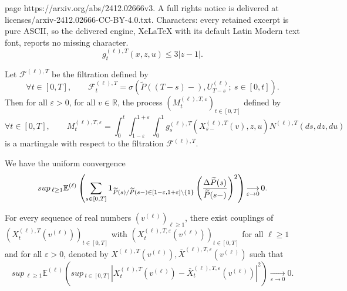 \documentclass[10pt,a4paper]{amsart}
\def\E{\mathbb{E}}
\def \R{\mathbb {R}}
\renewcommand{\sup}{sup\,}
\def\vp{\varepsilon}
\begin{document}
page https://arxiv.org/abs/2412.02666v3. A full rights notice is delivered at licenses/arxiv-2412.02666-CC-BY-4.0.txt. Characters: every retained excerpt is pure ASCII, so the delivered engine, XeLaTeX with its default Latin Modern text font, reports no missing character.
\begin{equation}\label{eq majoration g discret}
	g_t^{(\ell),T}(x,z,u) \le 3 \vert z-1 \vert.
\end{equation}

\begin{lemma}\label{lemme martingale}
	Let $\mathcal{F}^{(\ell),T}$ be the filtration defined by
	$$
	\forall t \in [0,T], \qquad
	\mathcal{F}^{(\ell),T}_t
	= \sigma\left(
	\widetilde{P}((T-s)-), U_{T-s}^{(\ell)}; \ s \in [0,t]
	\right).
	$$
	Then for all $\vp>0$, for all $v\in \R$, the process $(M^{(\ell),T,\vp}_t)_{t \in [0,T]}$ defined by
	$$
	\forall t \in [0,T],\qquad
	M^{(\ell),T,\vp}_t
	=\int_0^t\int_{1-\vp}^{1+\vp} \int_0^1 g_s^{(\ell),T} ( X^{(\ell),T}_{s-}(v),z,u) N^{(\ell),T}(ds,dz,du)
	$$
	is a martingale with respect to the filtration $\mathcal{F}^{(\ell),T}$.
\end{lemma}

\begin{lemma}\label{lemme petits sauts de P}
	We have the uniform convergence
	$$
	\sup_{\ell \ge 1}
	\E^{(\ell)}
	\left(
	\sum_{s \in[0,T]} {\bf 1}_{\widetilde{P}(s)/\widetilde{P}(s-) \in [1-\vp,1+\vp]\setminus \{1\}}
	\left(\frac{\Delta \widetilde{P}(s)}{\widetilde{P}(s-)}\right)^2 
	\right)
	\mathop{\longrightarrow}\limits_{\vp \to 0}0.
	$$
\end{lemma}

\begin{lemma}\label{lemme couplage}
For every sequence of real numbers $(v^{(\ell)})_{\ell \ge 1}$, there exist couplings of $(X^{(\ell),T}_t(v^{(\ell)}))_{t \in [0,T]}$ with $(X^{(\ell),T,\vp}_t(v^{(\ell)}))_{t \in [0,T]}$ for all $\ell \ge 1$ and for all $\vp >0$, denoted by $X^{(\ell),T}(v^{(\ell)}),\overline{X}^{(\ell),T,\vp}(v^{(\ell)})$ such that
$$
\sup_{\ell \ge 1} \E^{(\ell)} 
\left(\sup_{t\in [0,T]} 
\left|
X^{(\ell),T}_t(v^{(\ell)})
-
\overline{X}^{(\ell),T,\vp}_t(v^{(\ell)})
\right|^2
\right)
\mathop{\longrightarrow}\limits_{\vp \to 0} 0.
$$
\end{lemma}
\end{document}
